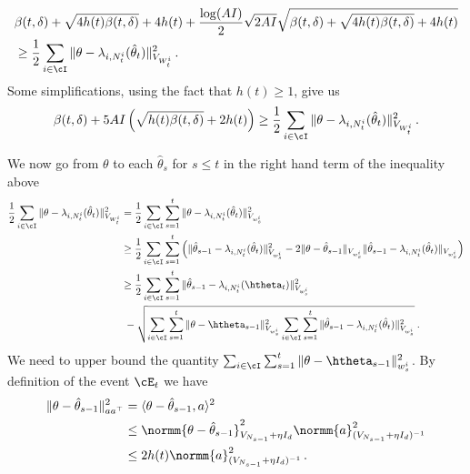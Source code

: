 \begin{align*}
    &\beta(t,\delta) + \sqrt{4 h(t) \beta(t,\delta)} +4h(t)+\frac{\log(AI)}{2} \sqrt{2 AI}\sqrt{\beta(t,\delta) + \sqrt{4 h(t) \beta(t,\delta)} +4h(t)}\\
    &\geq \frac{1}{2} \sum_{i\in\cI}\Vert \theta - \lambda_{i,N_t^i}(\hat{\theta}_t) \Vert_{V_{W_t^i}}^2\,.
\end{align*}
Some simplifications, using the fact that $h(t)\geq 1 $, give us%
\begin{equation}
  \label{eq:to_W_cvx}
  \beta(t,\delta)+5AI\left( \sqrt{h(t)\beta(t,\delta)}+2h(t)\right)
  \geq  \frac{1}{2} \sum_{i\in\cI}\Vert \theta - \lambda_{i,N_t^i}(\hat{\theta}_t) \Vert_{V_{W_t^i}}^2\,.
\end{equation}

We now go from $\theta$ to each $\hat{\theta}_s$ for $s \leq t$ in the right hand term of the inequality above
\begin{align}
\frac{1}{2} \sum_{i\in\cI}\Vert \theta - \lambda_{i,N_t^i}(\hat{\theta}_t) \Vert_{V_{W_t^i}}^2
&=   \frac{1}{2}\sum_{i\in\cI} \sum_{s=1}^t  \Vert \theta - \lambda_{i,N_t^i}(\hat{\theta}_t) \Vert_{V_{w^i_s}}^2
\nonumber\\
&\geq\frac{1}{2} \sum_{i\in\cI} \sum_{s=1}^t \left(\Vert \hat{\theta}_{s-1} - \lambda_{i,N_t^i}(\hat{\theta}_t)\Vert_{V_{w^i_s}}^2 - 2\Vert \theta - \hat{\theta}_{s-1} \Vert_{V_{w^i_s}} \Vert \hat{\theta}_{s-1} - \lambda_{i,N_t^i}(\hat{\theta}_t) \Vert_{V_{w^i_s}}\right)
\nonumber\\
&\geq\frac{1}{2} \sum_{i\in\cI}\sum_{s=1}^t \Vert \hat{\theta}_{s-1} - \lambda_{i,N_t^i}(\htheta_t) \Vert_{V_{w^i_s}}^2
\nonumber\\
&\ - \sqrt{ \sum_{i\in\cI}\sum_{s=1}^t \Vert \theta - \htheta_{s-1} \Vert_{V_{w^i_s}}^2  \sum_{i\in\cI}\sum_{s=1}^t\Vert \hat{\theta}_{s-1} -\lambda_{i,N_t^i}(\hat{\theta}_t) \Vert_{V_{w_s^i}}^2}
\: .\label{eq:tempW_cvx}
\end{align}
We need to upper bound the quantity $ \sum_{i\in\cI}\sum_{s=1}^t \Vert \theta - \htheta_{s-1} \Vert_{w_s^i}^2$. By definition of the event $\cE_t$ we have
\begin{align*}
  \Vert \theta - \hat{\theta}_{s-1} \Vert_{a a^\top}^2 &=  \langle \theta - \hat{\theta}_{s-1} ,a\rangle^2\\
  &\leq\normm{ \theta - \hat{\theta}_{s-1}}_{V_{N_{s-1}}+\eta I_d}^2 \normm{ a}_{(V_{N_{s-1}}+\eta I_d)^{-1}}^2\\
  &\leq 2 h(t) \normm{ a }_{(V_{N_{s-1}}+\eta I_d)^{-1}}^2\,.
\end{align*}
